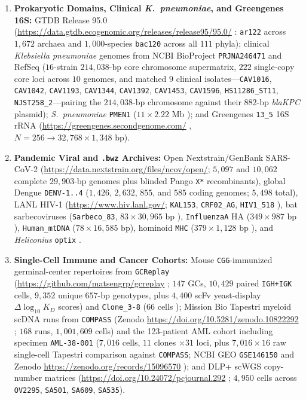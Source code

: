 \documentclass[12pt]{article}
\begin{document}
\begin{enumerate}
    \item \textbf{Prokaryotic Domains, Clinical \textit{K.\ pneumoniae}, and Greengenes 16S:} GTDB Release 95.0 (\url{https://data.gtdb.ecogenomic.org/releases/release95/95.0/} \cite{parks2018gtdb,parks2020gtdb}: \texttt{ar122} across $1,672$ archaea and $1,000$-species \texttt{bac120} across all $111$ phyla); clinical \textit{Klebsiella pneumoniae} genomes from NCBI BioProject \texttt{PRJNA246471} and RefSeq \cite{wyres2020population} ($16$-strain $214,038\text{-bp}$ core chromosome supermatrix, $222$ single-copy core loci across $10$ genomes, and matched $9$ clinical isolates---\texttt{CAV1016}, \texttt{CAV1042}, \texttt{CAV1193}, \texttt{CAV1344}, \texttt{CAV1392}, \texttt{CAV1453}, \texttt{CAV1596}, \texttt{HS11286\_ST11}, \texttt{NJST258\_2}---pairing the $214,038\text{-bp}$ chromosome against their $882\text{-bp}$ \textit{blaKPC} plasmid); \textit{S.\ pneumoniae} \texttt{PMEN1} ($11 \times 2.22\text{ Mb}$ \cite{croucher2011rapid}); and Greengenes \texttt{13\_5} 16S rRNA (\url{https://greengenes.secondgenome.com/} \cite{mcdonald2012greengenes}, $N = 256 \to 32,768 \times 1,348\text{ bp}$).
    \item \textbf{Pandemic Viral and \texttt{.bwz} Archives:} Open Nextstrain/GenBank SARS-CoV-2 (\url{https://data.nextstrain.org/files/ncov/open/}; $5,097$ and $10,062$ complete $29,903\text{-bp}$ genomes plus blinded Pango \texttt{X*} recombinants), global Dengue \texttt{DENV-1..4} ($1,426$, $2,632$, $855$, and $585$ coding genomes; $5,498$ total), LANL HIV-1 (\url{https://www.hiv.lanl.gov/}; \texttt{KAL153}, \texttt{CRF02\_AG}, \texttt{HIV1\_518} \cite{carr1998full,robertson2000hiv1}), bat sarbecoviruses (\texttt{Sarbeco\_83}, $83 \times 30,965\text{ bp}$ \cite{boni2020evolutionary,lytras2022exploring}), \texttt{InfluenzaA} HA ($349 \times 987\text{ bp}$), \texttt{Human\_mtDNA} ($78 \times 16,585\text{ bp}$), hominoid \texttt{MHC} ($379 \times 1,128\text{ bp}$ \cite{parham1996population}), and \textit{Heliconius} \texttt{optix} \cite{pardodiaz2012adaptive,dasmahapatra2012butterfly}.
    \item \textbf{Single-Cell Immune and Cancer Cohorts:} Mouse \texttt{CGG}-immunized germinal-center repertoires from \texttt{GCReplay} (\url{https://github.com/matsengrp/gcreplay} \cite{dewitt2026gcreplay}; $147$ GCs, $10,429$ paired \texttt{IGH+IGK} cells, $9,352$ unique $657\text{-bp}$ genotypes, plus $4,400$ scFv yeast-display $\Delta\log_{10} K_D$ scores) and \texttt{Clone\_3-8} ($66$ cells \cite{tas2016visualizing}); Mission Bio Tapestri myeloid scDNA runs from \texttt{COMPASS} (Zenodo \url{https://doi.org/10.5281/zenodo.10822292} \cite{sollier2023compass}; $168$ runs, $1,001,609$ cells) and the 123-patient AML cohort including specimen \texttt{AML-38-001} ($7,016$ cells, $11$ clones $\times 31$ loci, plus $7,016 \times 16$ raw single-cell Tapestri comparison against \texttt{COMPASS}; NCBI GEO \texttt{GSE146150} and Zenodo \url{https://zenodo.org/records/15096570} \cite{morita2020clonal}); and DLP+ scWGS copy-number matrices (\url{https://doi.org/10.24072/pcjournal.292} \cite{salehi2023sitka}; $4,950$ cells across \texttt{OV2295}, \texttt{SA501}, \texttt{SA609}, \texttt{SA535}).

\end{enumerate}
\end{document}
